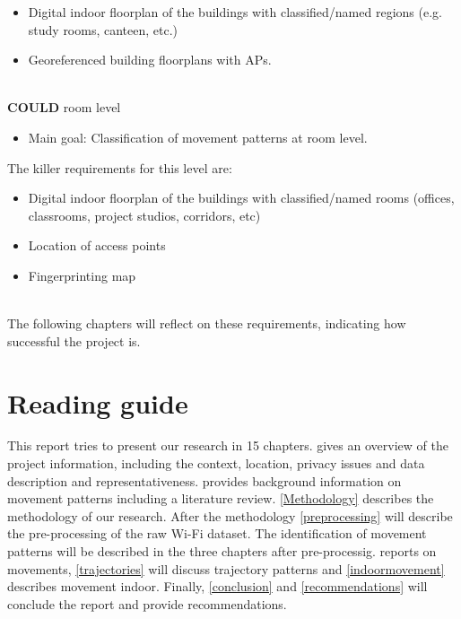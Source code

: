 \begin{itemize}
\item Digital indoor floorplan of the buildings with classified/named regions (e.g. study rooms, canteen, etc.)
\item Georeferenced building floorplans with APs.\\\\
\end{itemize}
\textbf{COULD} room level
\begin{itemize}
\item {\color{black!50}Main goal: Classification of movement patterns at room level.}
\end{itemize}
The killer requirements for this level are:
\begin{itemize}
\item {\color{black!50}Digital indoor floorplan of the buildings with classified/named rooms (offices, classrooms, project studios, corridors, etc)}
\item {\color{black!50}Location of access points}
\item {\color{black!50}Fingerprinting map}\\\\
\end{itemize}
The following chapters will reflect on these requirements, indicating how successful the project is.
\pagebreak

\section{Reading guide}
This report tries to present our research in 15 chapters.  gives an overview of the project information, including the context, location, privacy issues and data description and representativeness.  provides background information on movement patterns including a literature review. \autoref{Methodology} describes the methodology of our research. After the methodology \cref{preprocessing} will describe the pre-processing of the raw Wi-Fi dataset. The identification of movement patterns will be described in the three chapters after pre-processig.  reports on movements, \cref{trajectories} will discuss trajectory patterns and \cref{indoormovement} describes movement indoor. Finally, \cref{conclusion} and \cref{recommendations} will conclude the report and provide recommendations.

